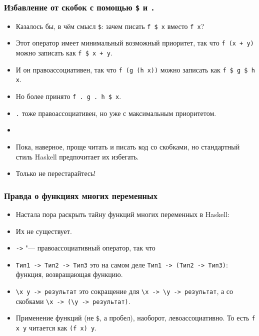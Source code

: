 \documentclass[10pt]{beamer}
\begin{document}
\begin{frame}[fragile]
\frametitle{Избавление от скобок с помощью \lstinline|$| и \lstinline|.|}
\begin{itemize}
    \item Казалось бы, в чём смысл \lstinline|$|: зачем писать \lstinline|f $ x| вместо \lstinline|f x|?\pause
    \item Этот оператор имеет минимальный возможный приоритет, так что \lstinline|f (x + y)| можно записать как \lstinline|f $ x + y|.\pause
    \item И он правоассоциативен, так что \lstinline|f (g (h x))| можно записать как \lstinline|f $ g $ h x|.\pause
    \item Но более принято \lstinline|f . g . h $ x|.\pause
    \item \lstinline|.| тоже правоассоциативен, но уже с максимальным приоритетом.\pause
    \item[]
    \item Пока, наверное, проще читать и писать код со скобками, но стандартный стиль Haskell предпочитает их избегать.
    \item Только не перестарайтесь!
\end{itemize}
\end{frame}

\begin{frame}[fragile]
\frametitle{Правда о функциях многих переменных}
\begin{itemize}
    \item Настала пора раскрыть тайну функций многих переменных в Haskell:\pause
    \item Их не существует.\pause
    \item \lstinline|->| "--- правоассоциативный оператор, так что
    \item[] \lstinline|Тип1 -> Тип2 -> Тип3| это на самом деле \lstinline|Тип1 -> (Тип2 -> Тип3)|: функция, возвращающая функцию.\pause
    \item \lstinline|\x y -> результат| это сокращение для \lstinline|\x -> \y -> результат|, а со скобками \lstinline|\x -> (\y -> результат)|.\pause
    \item Применение функций (не \lstinline|$|, а пробел), наоборот, левоассоциативно. То есть \lstinline|f x y| читается как \lstinline|(f x) y|.
\end{itemize}
\end{frame}
\end{document}
